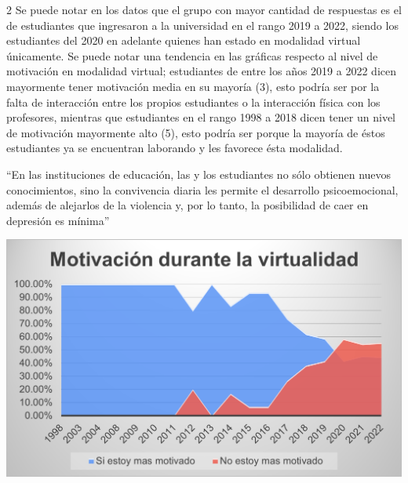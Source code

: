 \documentclass[12pt,spanish,Letterpaper,openany]{book}
\begin{document}
\begin {multicols}{2}
Se puede notar en los datos que el grupo con mayor cantidad de respuestas es el de estudiantes que ingresaron a la universidad en el rango 2019 a 2022, siendo los estudiantes del 2020 en adelante quienes han estado en modalidad virtual únicamente. Se puede notar una tendencia en las gráficas respecto al nivel de motivación en modalidad virtual; estudiantes de entre los años 2019 a 2022 dicen mayormente tener motivación media en su mayoría (3), esto podría ser por la falta de interacción entre los propios estudiantes o la interacción física con los profesores, mientras que estudiantes en el rango 1998 a 2018 dicen tener un nivel de motivación mayormente alto (5), esto podría ser porque la mayoría de éstos estudiantes ya se encuentran laborando y les favorece ésta modalidad.

``En las instituciones de educación, las y los estudiantes no sólo obtienen nuevos conocimientos, sino la convivencia diaria les permite el desarrollo psicoemocional, además de alejarlos de la violencia y, por lo tanto, la posibilidad de caer en depresión es mínima''

\begin {flushleft}
\noindent\begin{minipage}[c]{\columnwidth}
\centering

\includegraphics[width=1\linewidth]{images/pareja19_image4}

\end{minipage}
\end {flushleft}

\begin {flushleft}
\noindent\begin{minipage}[c]{\columnwidth}
\centering


\end{minipage}
\end{flushleft}
\end{multicols}
\end{document}
